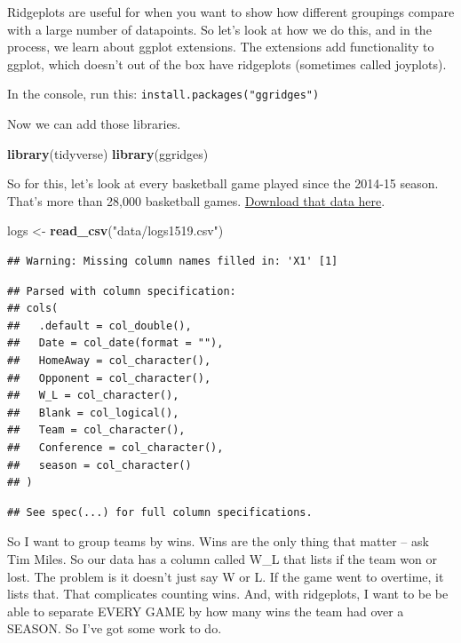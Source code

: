 \documentclass[]{book}
\newenvironment{Shaded}{\begin{snugshade}}{\end{snugshade}}
\newcommand{\KeywordTok}[1]{\textcolor[rgb]{0.13,0.29,0.53}{\textbf{#1}}}
\newcommand{\NormalTok}[1]{#1}
\newcommand{\StringTok}[1]{\textcolor[rgb]{0.31,0.60,0.02}{#1}}
\begin{document}
Ridgeplots are useful for when you want to show how different groupings compare with a large number of datapoints. So let's look at how we do this, and in the process, we learn about ggplot extensions. The extensions add functionality to ggplot, which doesn't out of the box have ridgeplots (sometimes called joyplots).

In the console, run this: \texttt{install.packages("ggridges")}

Now we can add those libraries.

\begin{Shaded}
\begin{Highlighting}[]
\KeywordTok{library}\NormalTok{(tidyverse)}
\KeywordTok{library}\NormalTok{(ggridges)}
\end{Highlighting}
\end{Shaded}

So for this, let's look at every basketball game played since the 2014-15 season. That's more than 28,000 basketball games. \href{https://unl.box.com/s/u9407jj007fxtnu1vbkybdawaqg6j3fw}{Download that data here}.

\begin{Shaded}
\begin{Highlighting}[]
\NormalTok{logs <-}\StringTok{ }\KeywordTok{read_csv}\NormalTok{(}\StringTok{"data/logs1519.csv"}\NormalTok{)}
\end{Highlighting}
\end{Shaded}

\begin{verbatim}
## Warning: Missing column names filled in: 'X1' [1]
\end{verbatim}

\begin{verbatim}
## Parsed with column specification:
## cols(
##   .default = col_double(),
##   Date = col_date(format = ""),
##   HomeAway = col_character(),
##   Opponent = col_character(),
##   W_L = col_character(),
##   Blank = col_logical(),
##   Team = col_character(),
##   Conference = col_character(),
##   season = col_character()
## )
\end{verbatim}

\begin{verbatim}
## See spec(...) for full column specifications.
\end{verbatim}

So I want to group teams by wins. Wins are the only thing that matter -- ask Tim Miles. So our data has a column called W\_L that lists if the team won or lost. The problem is it doesn't just say W or L. If the game went to overtime, it lists that. That complicates counting wins. And, with ridgeplots, I want to be be able to separate EVERY GAME by how many wins the team had over a SEASON. So I've got some work to do.
\end{document}
